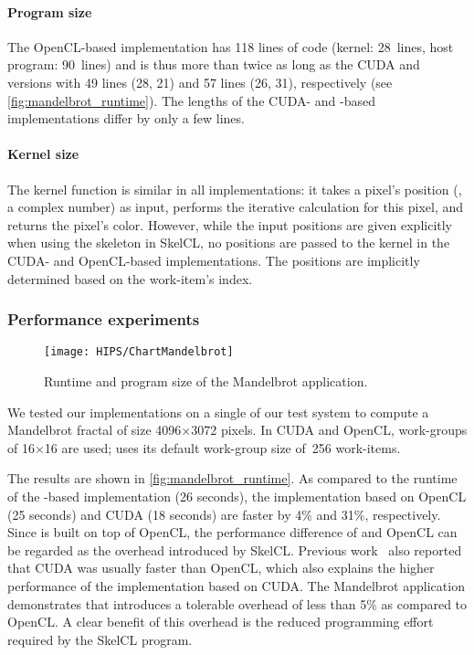 \paragraph{Program size}
The OpenCL-based implementation has 118 lines of code (kernel: 28~lines, host program: 90~lines) and is thus more than twice as long as the CUDA and \SkelCL versions with 49 lines (28, 21) and 57 lines (26, 31), respectively (see \autoref{fig:mandelbrot_runtime}).
The lengths of the CUDA- and \SkelCL-based implementations differ by only a few lines.

\paragraph{Kernel size}
The kernel function is similar in all implementations: it takes a pixel's position (\ie, a complex number) as input, performs the iterative calculation for this pixel, and returns the pixel's color.
However, while the input positions are given explicitly when using the \map skeleton in SkelCL, no positions are passed to the kernel in the CUDA- and OpenCL-based implementations.
The positions are implicitly determined based on the work-item's index.

\subsubsection*{Performance experiments}
\label{sec:mandelbrot:performance}

\begin{figure}[tb]
    \centering
    \texttt{[image: HIPS/ChartMandelbrot]}
    \caption{Runtime and program size of the Mandelbrot application.}
    \label{fig:mandelbrot_runtime}
\end{figure}%


We tested our implementations on a single \GPU of our test system to compute a Mandelbrot fractal of size 4096$\times$3072 pixels.
In CUDA and OpenCL, work-groups of 16$\times$16 are used; \SkelCL uses its default work-group size of~256 work-items.

The results are shown in \autoref{fig:mandelbrot_runtime}.
As compared to the runtime of the \SkelCL-based implementation (26 seconds), the implementation based on OpenCL (25 seconds) and CUDA (18 seconds) are faster by 4\% and 31\%, respectively.
Since \SkelCL is built on top of OpenCL, the performance difference of \SkelCL and OpenCL can be regarded as the overhead introduced by SkelCL.
Previous work~\cite{KongDiYaLiCaStMaZh2010} also reported that CUDA was usually faster than OpenCL, which also explains the higher performance of the implementation based on CUDA.
The Mandelbrot application demonstrates that \SkelCL introduces a tolerable overhead of less than 5\% as compared to OpenCL.
A clear benefit of this overhead is the reduced programming effort required by the SkelCL program.

